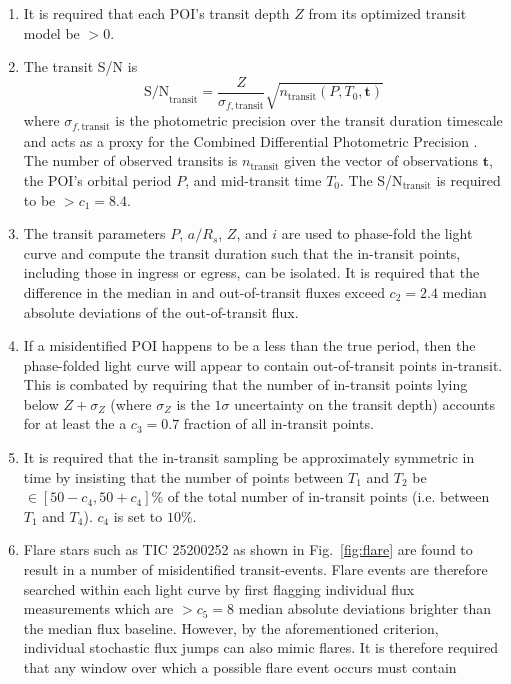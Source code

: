 \begin{enumerate}
\item It is required that each POI's transit depth $Z$ from its optimized transit model be $>0$.
\item The transit S/N is
  \begin{equation}
    \text{S/N}_{\text{transit}} = \frac{Z}{\sigma_{f,\text{transit}}} \sqrt{n_{\text{transit}}(P,T_0,\mathbf{t})}
  \end{equation}
  where $\sigma_{f,\text{transit}}$ is the photometric precision over the transit duration timescale
  and acts as a proxy for the Combined Differential Photometric Precision
  \citep[CDPP$_{\text{transit}}$;][]{christiansen12}. The number of observed transits is
  $n_{\text{transit}}$ given the vector of observations  $\mathbf{t}$, the POI's orbital
  period $P$, and mid-transit time $T_0$. The S/N$_{\text{transit}}$ is required to be $> c_1=8.4$.  
\item The transit parameters $P$, $a/R_s$, $Z$, and $i$ 
  are used to phase-fold the light curve and compute the transit duration \citep{winn10}
  such that the in-transit points, including those in ingress or egress, can be isolated.
  It is required that the difference in the median in and out-of-transit fluxes
  exceed $c_2=2.4$ median absolute deviations of the out-of-transit flux.
\item If a misidentified POI happens to be a less than the true period, then the phase-folded light curve
  will appear to contain out-of-transit points in-transit. This is combated by requiring that the number of
  in-transit points lying below $Z+\sigma_Z$ (where $\sigma_Z$ is the $1\sigma$ uncertainty on the
  transit depth) accounts for at least the a $c_3=0.7$ fraction of all in-transit points.
\item It is required that the in-transit sampling be approximately symmetric in time by insisting that the
  number of points between $T_1$ and $T_2$ be $\in [50-c_4,50+c_4]$\% of the total
  number of in-transit points (i.e. between $T_1$ and $T_4$). $c_4$ is set to $10$\%.
\item Flare stars such as TIC 25200252 as shown in Fig.~\ref{fig:flare} are found to result in a number
  of misidentified transit-events. Flare events are therefore searched within each light curve by first
  flagging individual flux measurements which are $>c_5=8$ median absolute deviations brighter than the
  median flux baseline. However, by the aforementioned criterion, individual stochastic flux jumps can also
  mimic flares. It is therefore required that any window over which a possible flare event occurs must contain

\end{enumerate}
